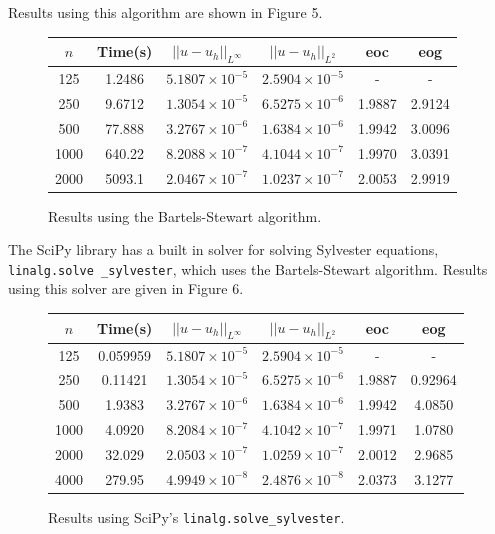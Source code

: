 \documentclass{article}
\numberwithin{equation}{section}
\begin{document}
Results using this algorithm are shown in Figure 5.

\begin{figure}[H]
\centering
\begin{tabular}{|c|c|c|c|c|c|}
\hline
$n$ & Time(s) & $|| u - u_h ||_{L^{\infty}}$ &$|| u - u_h ||_{L^{2}}$ & eoc & eog \\
\hline
125 & 1.2486 & $5.1807 \times 10^{-5}$ & $2.5904 \times 10^{-5}$ & - & - \\
250 & 9.6712 & $1.3054 \times 10^{-5}$ & $6.5275 \times 10^{-6}$ & 1.9887 & 2.9124 \\
500 & 77.888 & $3.2767 \times 10^{-6}$ & $1.6384 \times 10^{-6}$ & 1.9942 & 3.0096 \\ 
1000 & 640.22 & $8.2088 \times 10^{-7}$ & $4.1044 \times 10^{-7}$ & 1.9970 & 3.0391 \\
2000 & 5093.1 & $2.0467 \times 10^{-7}$ & $1.0237 \times 10^{-7}$ & 2.0053 & 2.9919 \\
\hline
\end{tabular}
\caption{Results using the Bartels-Stewart algorithm.}
\end{figure}

The SciPy library has a built in solver for solving Sylvester equations, \texttt{linalg.solve \_sylvester}, which uses the Bartels-Stewart algorithm. Results using this solver are given in Figure 6.

\begin{figure}[H]
\centering
\begin{tabular}{|c|c|c|c|c|c|}
\hline
$n$ & Time(s) & $|| u - u_h ||_{L^{\infty}}$ &$|| u - u_h ||_{L^{2}}$ & eoc & eog \\
\hline
125 & 0.059959 & $5.1807 \times 10^{-5}$ & $2.5904 \times 10^{-5}$ & - & - \\
250 & 0.11421 & $1.3054 \times 10^{-5}$ & $6.5275 \times 10^{-6}$ & 1.9887 & 0.92964 \\
500 & 1.9383 & $3.2767 \times 10^{-6}$ & $1.6384 \times 10^{-6}$ & 1.9942 & 4.0850  \\
1000 & 4.0920 & $8.2084 \times 10^{-7}$ & $4.1042 \times 10^{-7}$ & 1.9971 & 1.0780 \\
2000 & 32.029 & $2.0503 \times 10^{-7}$ & $1.0259 \times 10^{-7}$ & 2.0012 & 2.9685  \\
4000 & 279.95 & $4.9949 \times 10^{-8}$ & $2.4876 \times 10^{-8}$ & 2.0373 & 3.1277  \\
\hline
\end{tabular}
\caption{Results using SciPy's \texttt{linalg.solve\_sylvester}.}
\end{figure}
\end{document}

